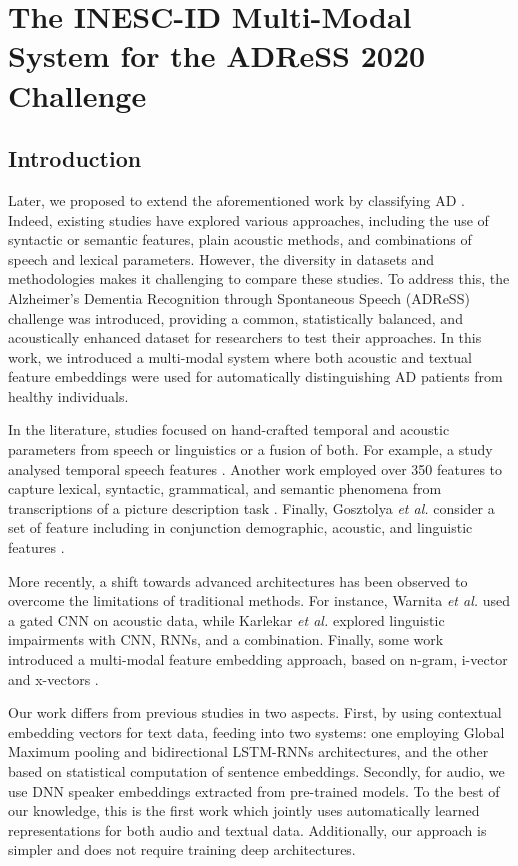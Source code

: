 \section{The INESC-ID Multi-Modal System for the ADReSS 2020 Challenge}
\subsection{Introduction}
Later, we proposed to extend the aforementioned work by classifying \ac{AD} \cite{pompili2020inesc}. Indeed, existing studies have explored various approaches, including the use of syntactic or semantic features, plain acoustic methods, and combinations of speech and lexical parameters. However, the diversity in datasets and methodologies makes it challenging to compare these studies. To address this, the Alzheimer's Dementia Recognition through Spontaneous Speech (ADReSS) challenge was introduced, providing a common, statistically balanced, and acoustically enhanced dataset for researchers to test their approaches. In this work, we introduced a multi-modal system where both acoustic and textual feature embeddings were used for automatically distinguishing \ac{AD} patients
from healthy individuals. 

In the literature, studies focused on hand-crafted temporal and acoustic parameters from speech or linguistics or a fusion of both. For example, a study analysed temporal speech features \cite{konig2015automatic}. Another work employed over 350 features to capture lexical, syntactic, grammatical, and semantic phenomena from transcriptions of a picture description task \cite{fraser2016linguistic}. Finally, Gosztolya \textit{et al.} consider a set of feature including in conjunction demographic, acoustic, and linguistic features \cite{gosztolya2019identifying}.

More recently, a shift towards advanced architectures has been observed to overcome the limitations of traditional methods. For instance, Warnita \textit{et al.} \cite{warnita18_interspeech} used a gated \ac{CNN} on acoustic data, while Karlekar \textit{et al.} \cite{karlekar-etal-2018-detecting} explored linguistic impairments with \ac{CNN}, \acp{RNN}, and a combination. Finally, some work introduced a multi-modal feature embedding approach, based on n-gram, i-vector and x-vectors \cite{zargarbashi2019multi}.

Our work differs from previous studies in two aspects. First, by using contextual embedding vectors for text data, feeding into two systems: one employing Global Maximum pooling and bidirectional \ac{LSTM}-\acp{RNN} architectures, and the other based on statistical computation of sentence embeddings. Secondly, for audio, we use \ac{DNN} speaker embeddings extracted from pre-trained models. To the best of our knowledge, this is the first work which jointly uses automatically learned representations for both audio and textual data. Additionally, our approach is simpler and does not require training deep architectures.

